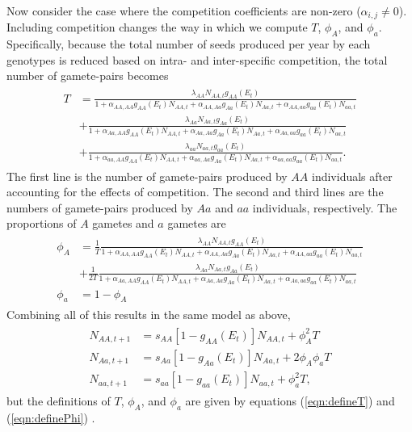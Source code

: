 \documentclass[11pt]{article}
\begin{document}
Now consider the case where the competition coefficients are non-zero ($\alpha_{i,j}\neq0$).  Including competition changes the way in which we compute $T$, $\phi_A$, and $\phi_a$.  Specifically, because the total number of seeds produced per year by each genotypes is reduced based on intra- and inter-specific competition, the total number of gamete-pairs becomes
\begin{align}\begin{split}
T &=  \frac{\lambda_{AA}N_{AA,t}g_{AA}(E_t)}{1+ \alpha_{AA,AA}g_{AA}(E_t)N_{AA,t} + \alpha_{AA,Aa}g_{Aa}(E_t)N_{Aa,t}+ \alpha_{AA,aa}g_{aa}(E_t)N_{aa,t}} \\ 
&+ \frac{\lambda_{Aa}N_{Aa,t}g_{Aa}(E_t)}{1+ \alpha_{Aa,AA}g_{AA}(E_t)N_{AA,t} + \alpha_{Aa,Aa}g_{Aa}(E_t)N_{Aa,t}+ \alpha_{Aa,aa}g_{aa}(E_t)N_{aa,t}}\\
&+\frac{\lambda_{aa}N_{aa,t}g_{aa}(E_t)}{1+ \alpha_{aa,AA}g_{AA}(E_t)N_{AA,t} + \alpha_{aa,Aa}g_{Aa}(E_t)N_{Aa,t}+ \alpha_{aa,aa}g_{aa}(E_t)N_{aa,t}}.
\label{eqn:defineT}
\end{split}\end{align}
The first line is the number of gamete-pairs produced by $AA$ individuals after accounting for the effects of competition.  The second and third lines are the numbers of gamete-pairs produced by $Aa$ and $aa$ individuals, respectively. The proportions of $A$ gametes and $a$ gametes are 
\begin{align}\begin{split}
\phi_A &= \frac{1}{T}\frac{\lambda_{AA}N_{AA,t}g_{AA}(E_t)}{1+ \alpha_{AA,AA}g_{AA}(E_t)N_{AA,t} + \alpha_{AA,Aa}g_{Aa}(E_t)N_{Aa,t}+ \alpha_{AA,aa}g_{aa}(E_t)N_{aa,t}} \\
&+ \frac{1}{2T}\frac{\lambda_{Aa}N_{Aa,t}g_{Aa}(E_t)}{1+ \alpha_{Aa,AA}g_{AA}(E_t)N_{AA,t} + \alpha_{Aa,Aa}g_{Aa}(E_t)N_{Aa,t}+ \alpha_{Aa,aa}g_{aa}(E_t)N_{aa,t}}\\
\phi_a &= 1- \phi_A
\label{eqn:definePhi}
\end{split}\end{align}
Combining all of this results in the same model as above,
\begin{align}\begin{split}
N_{AA,t+1} &= s_{AA}[1-g_{AA}(E_t)]N_{AA,t} + \phi_A^2T\\
N_{Aa,t+1} &= s_{Aa}[1-g_{Aa}(E_t)]N_{Aa,t} + 2 \phi_A\phi_aT\\
N_{aa,t+1} &= s_{aa}[1-g_{aa}(E_t)]N_{aa,t} + \phi_a^2T,
\end{split}\end{align}
but the definitions of $T$, $\phi_A$, and $\phi_a$ are given by equations (\ref{eqn:defineT}) and (\ref{eqn:definePhi}) . 
\end{document}
